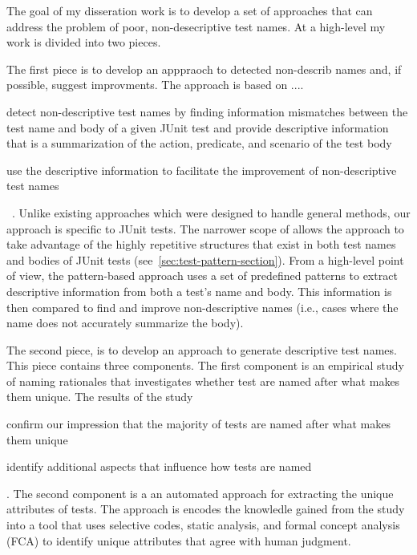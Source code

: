The goal of my disseration work is to develop a set of approaches that can address the problem of poor, non-desecriptive test names.
%
At a high-level my work is divided into two pieces.


The first piece is to develop an apppraoch to detected non-describ names and, if possible, suggest improvments.
%
The approach is based on ....
\begin{enumerate*}
\item detect non-descriptive test names by finding information mismatches between the test name and body of a given JUnit test and provide descriptive information that is a summarization of the action, predicate, and scenario of the test body
\item use the descriptive information to facilitate the improvement of non-descriptive test names
\end{enumerate*}~\cite{wu2020pattern}.
%
Unlike existing approaches which were designed to handle general methods, our approach is specific to JUnit tests.
%
The narrower scope of allows the approach to take advantage of the highly repetitive structures that exist in both test names and bodies of JUnit tests (see~\cref{sec:test-pattern-section}).
%
From a high-level point of view, the pattern-based approach uses a set of predefined patterns to extract descriptive information from both a test's name and body.
%
This information is then compared to find and improve non-descriptive names (i.e., cases where the name does not accurately summarize the body).


The second piece, is to develop an approach to generate descriptive test names.
This piece contains three components.
The first component is an empirical study of naming rationales that investigates whether test are named after what makes them unique.
%
The results of the study
\begin{enumerate*}
\item confirm our impression that the majority of tests are named after what makes them unique
\item identify additional aspects that influence how tests are named
\end{enumerate*}.
%
The second component is a an automated approach for extracting the unique attributes of tests.
The approach is encodes the knowledle gained from the study into a tool that uses selective codes, static analysis, and formal concept analysis (FCA) to identify unique attributes that agree with human judgment.


